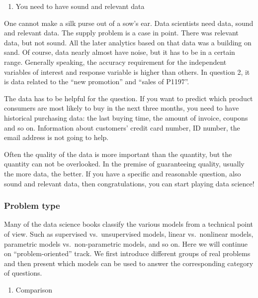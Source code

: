 \documentclass[
]{article}
\providecommand{\tightlist}{%
  \setlength{\itemsep}{0pt}\setlength{\parskip}{0pt}}
\begin{document}
\begin{enumerate}
\def\labelenumi{\arabic{enumi}.}
\setcounter{enumi}{1}
\tightlist
\item
  You need to have sound and relevant data
\end{enumerate}

One cannot make a silk purse out of a sow's ear. Data scientists need
data, sound and relevant data. The supply problem is a case in point.
There was relevant data, but not sound. All the later analytics based on
that data was a building on sand. Of course, data nearly almost have
noise, but it has to be in a certain range. Generally speaking, the
accuracy requirement for the independent variables of interest and
response variable is higher than others. In question 2, it is data
related to the ``new promotion'' and ``sales of P1197''.

The data has to be helpful for the question. If you want to predict
which product consumers are most likely to buy in the next three months,
you need to have historical purchasing data: the last buying time, the
amount of invoice, coupons and so on. Information about customers'
credit card number, ID number, the email address is not going to help.

Often the quality of the data is more important than the quantity, but
the quantity can not be overlooked. In the premise of guaranteeing
quality, usually the more data, the better. If you have a specific and
reasonable question, also sound and relevant data, then congratulations,
you can start playing data science!

\hypertarget{problem-type}{%
\subsubsection{Problem type}\label{problem-type}}

Many of the data science books classify the various models from a
technical point of view. Such as supervised vs.~unsupervised models,
linear vs.~nonlinear models, parametric models vs.~non-parametric
models, and so on. Here we will continue on ``problem-oriented'' track.
We first introduce different groups of real problems and then present
which models can be used to answer the corresponding category of
questions.

\begin{enumerate}
\def\labelenumi{\arabic{enumi}.}
\tightlist
\item
  Comparison
\end{enumerate}
\end{document}
